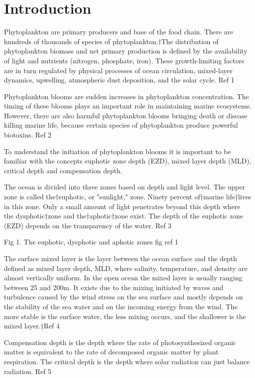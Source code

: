 \documentclass[../Main.tex]{subfiles}
\begin{document}
\section*{\crule[blue]{.3cm}{.3cm} Introduction}
Phytoplankton are primary producers and base of the food chain. There are hundreds of thousands of species of phytoplankton.†The distribution of phytoplankton biomass and net primary production is defined by the availability of light and nutrients (nitrogen, phosphate, iron). These growth-limiting factors are in turn regulated by physical processes of ocean circulation, mixed-layer dynamics, upwelling, atmospheric dust deposition, and the solar cycle. Ref 1

Phytoplankton blooms are sudden increases in phytoplankton concentration. The timing of these blooms plays an important role in maintaining marine ecosystems. However, there are also harmful phytoplankton blooms bringing death or disease killing marine life, because certain species of phytoplankton produce powerful biotoxins. Ref 2

To understand the initiation of phytoplankton blooms it is important to be familiar with the concepts euphotic zone depth (EZD), mixed layer depth (MLD), critical depth and compensation depth. 

The ocean is divided into three zones based on depth and light level. The upper zone is called the†euphotic, or "sunlight," zone. Ninety percent of†marine life†lives in this zone. Only a small amount of light penetrates beyond this depth where the dysphotic†zone and the†aphotic†zone exist. The depth of the euphotic zone (EZD) depends on the transparency of the water. Ref 3


Fig 1. The euphotic, dysphotic and aphotic zones fig  ref 1

The surface mixed layer is the layer between the ocean surface and the depth defined as mixed layer depth, MLD, where salinity, temperature, and density are almost vertically uniform. In the open ocean the mixed layer is usually ranging between 25 and 200m. It exists due to the mixing initiated by waves and turbulence caused by the wind stress on the sea surface and mostly depends on the stability of the sea water and on the incoming energy from the wind. The more stable is the surface water, the less mixing occurs, and the shallower is the mixed layer.†Ref 4



Compensation depth is the depth where the rate of photosynthesized organic matter is equivalent to the rate of decomposed organic matter by plant respiration. The critical depth is the depth where solar radiation can just balance radiation. Ref 5
\end{document}

